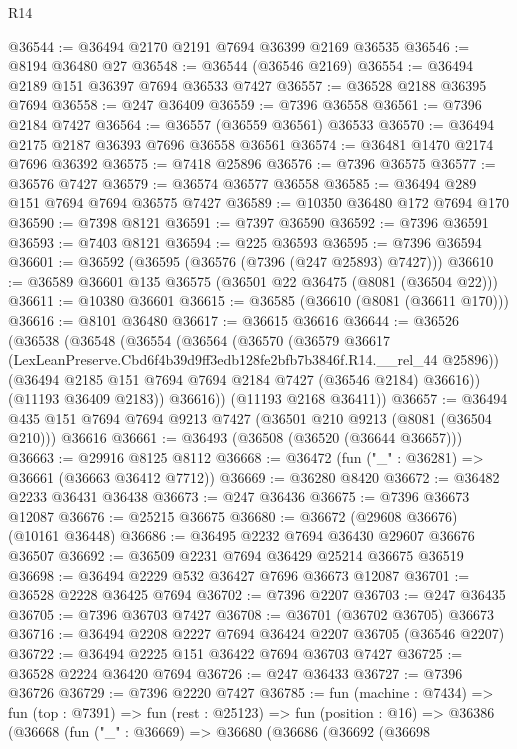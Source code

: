 \begin{lexlean}{R14}
\begin{coremodule}
@36544 := @36494 @2170 @2191 @7694 @36399 @2169 @36535
@36546 := @8194 @36480 @27
@36548 := @36544 (@36546 @2169)
@36554 := @36494 @2189 @151 @36397 @7694 @36533 @7427
@36557 := @36528 @2188 @36395 @7694
@36558 := @247 @36409
@36559 := @7396 @36558
@36561 := @7396 @2184 @7427
@36564 := @36557 (@36559 @36561) @36533
@36570 := @36494 @2175 @2187 @36393 @7696 @36558 @36561
@36574 := @36481 @1470 @2174 @7696 @36392
@36575 := @7418 @25896
@36576 := @7396 @36575
@36577 := @36576 @7427
@36579 := @36574 @36577 @36558
@36585 := @36494 @289 @151 @7694 @7694 @36575 @7427
@36589 := @10350 @36480 @172 @7694 @170
@36590 := @7398 @8121
@36591 := @7397 @36590
@36592 := @7396 @36591
@36593 := @7403 @8121
@36594 := @225 @36593
@36595 := @7396 @36594
@36601 := @36592 (@36595 (@36576 (@7396 (@247 @25893) @7427)))
@36610 := @36589 @36601 @135 @36575 (@36501 @22 @36475 (@8081 (@36504 @22)))
@36611 := @10380 @36601
@36615 := @36585 (@36610 (@8081 (@36611 @170)))
@36616 := @8101 @36480
@36617 := @36615 @36616
@36644 := @36526
    (@36538
      (@36548
        (@36554
          (@36564
            (@36570
              (@36579
                @36617
                (LexLeanPreserve.Cbd6f4b39d9ff3edb128fe2bfb7b3846f.R14.__rel_44 @25896))
              (@36494 @2185 @151 @7694 @7694 @2184 @7427 (@36546 @2184) @36616))
            (@11193 @36409 @2183))
          @36616))
      (@11193 @2168 @36411))
@36657 := @36494 @435 @151 @7694 @7694 @9213 @7427 (@36501 @210 @9213 (@8081 (@36504 @210))) @36616
@36661 := @36493 (@36508 (@36520 (@36644 @36657)))
@36663 := @29916 @8125 @8112
@36668 := @36472 (fun ("_" : @36281) => @36661 (@36663 @36412 @7712))
@36669 := @36280 @8420
@36672 := @36482 @2233 @36431 @36438
@36673 := @247 @36436
@36675 := @7396 @36673 @12087
@36676 := @25215 @36675
@36680 := @36672 (@29608 @36676) (@10161 @36448)
@36686 := @36495 @2232 @7694 @36430 @29607 @36676 @36507
@36692 := @36509 @2231 @7694 @36429 @25214 @36675 @36519
@36698 := @36494 @2229 @532 @36427 @7696 @36673 @12087
@36701 := @36528 @2228 @36425 @7694
@36702 := @7396 @2207
@36703 := @247 @36435
@36705 := @7396 @36703 @7427
@36708 := @36701 (@36702 @36705) @36673
@36716 := @36494 @2208 @2227 @7694 @36424 @2207 @36705 (@36546 @2207)
@36722 := @36494 @2225 @151 @36422 @7694 @36703 @7427
@36725 := @36528 @2224 @36420 @7694
@36726 := @247 @36433
@36727 := @7396 @36726
@36729 := @7396 @2220 @7427
@36785 := fun (machine : @7434) =>
  fun (top : @7391) =>
  fun (rest : @25123) =>
  fun (position : @16) =>
  @36386
    (@36668
      (fun ("_" : @36669) =>
      @36680
        (@36686
          (@36692
            (@36698

\end{coremodule}
\end{lexlean}
